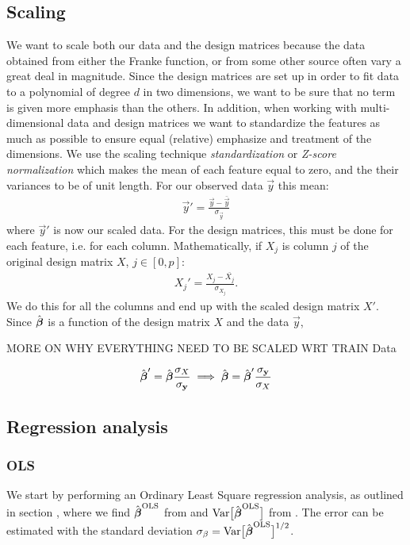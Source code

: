     \subsection{Scaling}\label{sec:scaling}
        We want to scale both our data and the design matrices because the data obtained from either the Franke function, or from some other source often vary a great deal in magnitude. Since the design matrices are set up in order to fit data to a polynomial of degree $d$ in two dimensions, we want to be sure that no term is given more emphasis than the others. In addition, when working with multi-dimensional data and design matrices we want to standardize the features as much as possible to ensure equal (relative) emphasize and treatment of the dimensions. We use the scaling technique \textit{standardization} or \textit{Z-score normalization} which makes the mean of each feature equal to zero, and the their variances to be of unit length. For our observed data $\vec{y}$ this mean:
        \begin{align*}
            \vec{y}' = \frac{\vec{y}-\bar{\vec{y}}}{\sigma_{\vec{y}}}
        \end{align*}
        where $\vec{y}'$ is now our scaled data. For the design matrices, this must be done for each feature, i.e. for each column.  Mathematically, if $X_j$ is column $j$ of the original design matrix $X$, $j\in[0,p]$:
        \begin{align*}
            X_j' = \frac{X_j-\bar{X_j}}{\sigma_{X_j}}.
        \end{align*}
        We do this for all the columns and end up with the scaled design matrix $X'$. Since $\hat{\boldsymbol{\beta}}$ is a function of the design matrix $X$ and the data $\vec{y}$,
        
        MORE ON WHY EVERYTHING NEED TO BE SCALED WRT TRAIN Data

    \begin{align*}
        \hat{\boldsymbol{\beta}}' = \hat{\boldsymbol{\beta}}\frac{\sigma_X}{\sigma_{\mathbf{y}}} \implies \hat{\boldsymbol{\beta}} = \hat{\boldsymbol{\beta}}'\frac{\sigma_{\mathbf{y}}}{\sigma_X}
    \end{align*}


    \subsection{Regression analysis}\label{sec:reganalysis}

        \subsubsection{OLS}\label{sec:olsanalysis}
            We start by performing an Ordinary Least Square regression analysis, as outlined in section , where we find $\hat{\boldsymbol{\beta}}^\text{OLS}$ from  and $\text{Var}\big[\hat{\boldsymbol{\beta}}^{\text{OLS}}\big]$ from . The error can be estimated with the standard deviation $\mathbf{\sigma}_{\beta} = \text{Var}\big[\hat{\boldsymbol{\beta}}^{\text{OLS}}\big]^{1/2}$. 

